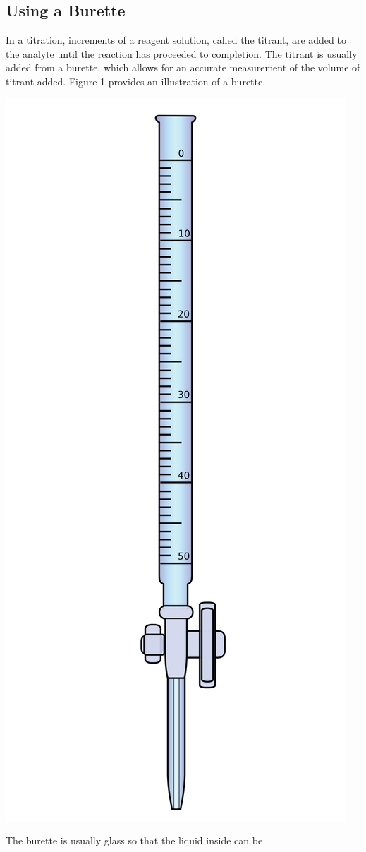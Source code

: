 \documentclass{article}
\begin{document}
\subsection {Using a Burette} In a titration, increments of a reagent solution,
called the titrant, are added to the analyte until the reaction has proceeded to
completion. The titrant is usually added from a burette, which allows for an
accurate measurement of the volume of titrant added.\cite{Harris} Figure 1
provides an illustration of a burette.  \begin{center} \includegraphics[scale =
0.05]{buret} 
\end{center} The burette is usually glass so that the liquid inside can be
\end{document}
